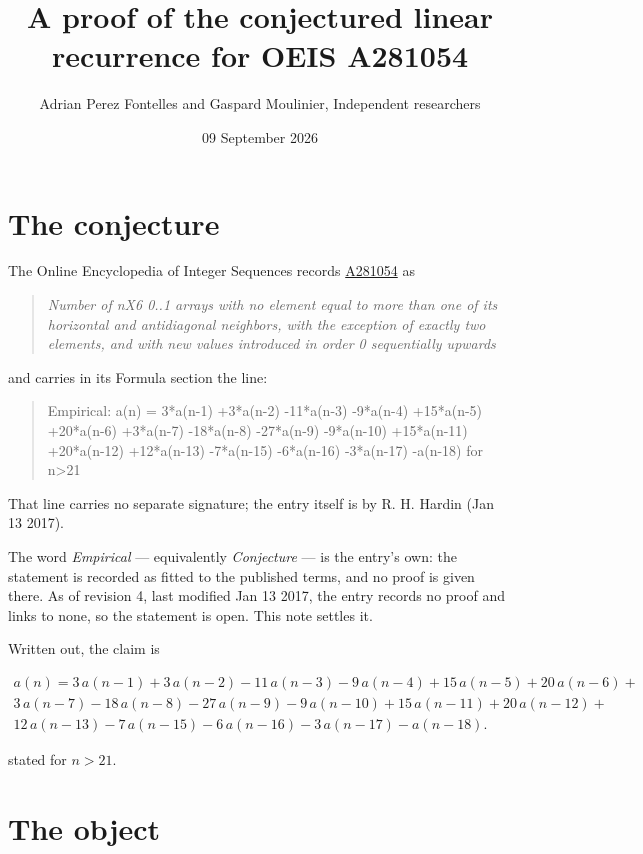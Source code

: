 \documentclass[11pt]{article}
\title{A proof of the conjectured linear recurrence for OEIS A281054}
\author{Adrian Perez Fontelles and Gaspard Moulinier, Independent researchers}
\date{09 September 2026}
\theoremstyle{definition}
\begin{document}
\maketitle
\section{The conjecture}

The Online Encyclopedia of Integer Sequences records \href{https://oeis.org/A281054}{A281054} as

\begin{quote}\itshape Number of nX6 0..1 arrays with no element equal to more than one of its horizontal and antidiagonal neighbors, with the exception of exactly two elements, and with new values introduced in order 0 sequentially upwards\end{quote}

and carries in its Formula section the line:

\begin{quote}\ttfamily Empirical: a(n) = 3*a(n-1) +3*a(n-2) -11*a(n-3) -9*a(n-4) +15*a(n-5) +20*a(n-6) +3*a(n-7) -18*a(n-8) -27*a(n-9) -9*a(n-10) +15*a(n-11) +20*a(n-12) +12*a(n-13) -7*a(n-15) -6*a(n-16) -3*a(n-17) -a(n-18) for n>21\end{quote}

That line carries no separate signature; the entry itself is by R. H. Hardin (Jan 13 2017).

The word {\itshape Empirical} --- equivalently {\itshape Conjecture} --- is the entry's own: the statement is recorded as fitted to the published terms, and no proof is given there. As of revision 4, last modified Jan 13 2017, the entry records no proof and links to none, so the statement is open. This note settles it.

Written out, the claim is

\begin{multline*} a(n) = 3\,a(n-1) + 3\,a(n-2) - 11\,a(n-3) - 9\,a(n-4) + 15\,a(n-5) + 20\,a(n-6) + \\ 3\,a(n-7) - 18\,a(n-8) - 27\,a(n-9) - 9\,a(n-10) + 15\,a(n-11) + 20\,a(n-12) + \\ 12\,a(n-13) - 7\,a(n-15) - 6\,a(n-16) - 3\,a(n-17) - a(n-18). \end{multline*}

stated for $n > 21$.

\section{The object}
\end{document}
